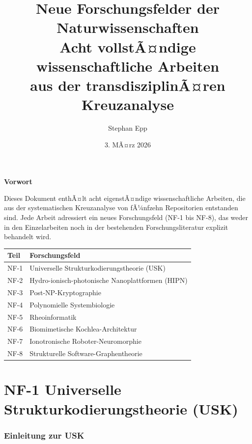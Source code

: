 ﻿\documentclass[a4paper,12pt]{scrreprt}
\title{\textbf{Neue Forschungsfelder der Naturwissenschaften}\\[0.8ex]
  \large Acht vollstÃ¤ndige wissenschaftliche Arbeiten\\
  aus der transdisziplinÃ¤ren Kreuzanalyse}
\author{Stephan Epp}
\date{3. MÃ¤rz 2026}
\theoremstyle{definition}
\begin{document}
\maketitle
\newpage

\begin{center}
\Large\textbf{Vorwort}
\end{center}
\bigskip
Dieses Dokument enthÃ¤lt acht eigenstÃ¤ndige wissenschaftliche Arbeiten,
die aus der systematischen Kreuzanalyse von fÃ¼nfzehn Repositorien
entstanden sind. Jede Arbeit adressiert ein neues Forschungsfeld (NF-1
bis NF-8), das weder in den Einzelarbeiten noch in der bestehenden
Forschungsliteratur explizit behandelt wird.

\medskip
\begin{center}
\begin{tabular}{ll}
\toprule
\textbf{Teil} & \textbf{Forschungsfeld} \\
\midrule
NF-1 & Universelle Strukturkodierungstheorie (USK) \\
NF-2 & Hydro-ionisch-photonische Nanoplattformen (HIPN) \\
NF-3 & Post-NP-Kryptographie \\
NF-4 & Polynomielle Systembiologie \\
NF-5 & Rheoinformatik \\
NF-6 & Biomimetische Kochlea-Architektur \\
NF-7 & Ionotronische Roboter-Neuromorphie \\
NF-8 & Strukturelle Software-Graphentheorie \\
\bottomrule
\end{tabular}
\end{center}

\newpage
\tableofcontents
\newpage

\part{NF-1 \quad Universelle Strukturkodierungstheorie (USK)}
\label{part:nf1}

\section{Einleitung zur USK}
\end{document}

